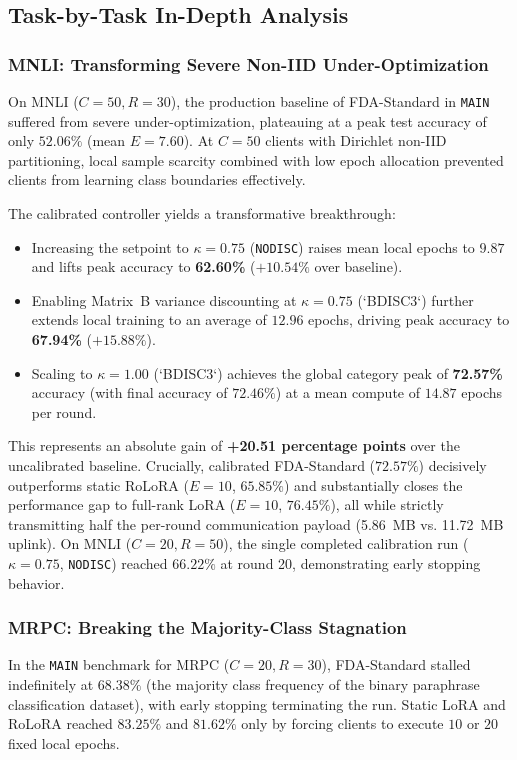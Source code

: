 \documentclass[10pt,a4paper]{article}
\begin{document}
\subsection{Task-by-Task In-Depth Analysis}

\subsubsection{MNLI: Transforming Severe Non-IID Under-Optimization}
On MNLI ($C=50, R=30$), the production baseline of FDA-Standard in \texttt{MAIN} suffered from severe under-optimization, plateauing at a peak test accuracy of only $52.06\%$ (mean $E = 7.60$).
At $C=50$ clients with Dirichlet non-IID partitioning, local sample scarcity combined with low epoch allocation prevented clients from learning class boundaries effectively.

The calibrated controller yields a transformative breakthrough:
\begin{itemize}
    \item Increasing the setpoint to $\kappa = 0.75$ (\texttt{NODISC}) raises mean local epochs to $9.87$ and lifts peak accuracy to \textbf{62.60\%} ($+10.54\%$ over baseline).
    \item Enabling Matrix~B variance discounting at $\kappa = 0.75$ (`BDISC3`) further extends local training to an average of $12.96$ epochs, driving peak accuracy to \textbf{67.94\%} ($+15.88\%$).
    \item Scaling to $\kappa = 1.00$ (`BDISC3`) achieves the global category peak of \textbf{72.57\%} accuracy (with final accuracy of $72.46\%$) at a mean compute of $14.87$ epochs per round.
\end{itemize}
This represents an absolute gain of \textbf{+20.51 percentage points} over the uncalibrated baseline.
Crucially, calibrated FDA-Standard ($72.57\%$) decisively outperforms static RoLoRA ($E=10$, $65.85\%$) and substantially closes the performance gap to full-rank LoRA ($E=10$, $76.45\%$), all while strictly transmitting half the per-round communication payload (5.86~MB vs. 11.72~MB uplink).
On MNLI ($C=20, R=50$), the single completed calibration run ($\kappa=0.75$, \texttt{NODISC}) reached $66.22\%$ at round 20, demonstrating early stopping behavior.

\subsubsection{MRPC: Breaking the Majority-Class Stagnation}
In the \texttt{MAIN} benchmark for MRPC ($C=20, R=30$), FDA-Standard stalled indefinitely at $68.38\%$ (the majority class frequency of the binary paraphrase classification dataset), with early stopping terminating the run.
Static LoRA and RoLoRA reached $83.25\%$ and $81.62\%$ only by forcing clients to execute $10$ or $20$ fixed local epochs.
\end{document}
